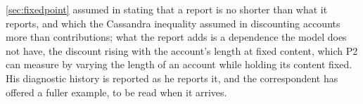 \autoref{sec:fixedpoint} assumed in stating that a report is no shorter than what it reports, and which the Cassandra inequality assumed in discounting accounts more than contributions; what the report adds is a dependence the model does not have, the discount rising with the account's length at fixed content, which P2 can measure by varying the length of an account while holding its content fixed. His diagnostic history is reported as he reports it, and the correspondent has offered a fuller example, to be read when it arrives.
